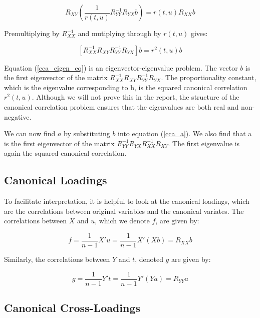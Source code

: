 \begin{equation}
 R_{XY}\left( \frac{1}{r(t,u)}R^{-1}_{YY}R_{YX}b \right) = r(t,u)R_{XX}b
\end{equation}

Premultiplying by $R^{-1}_{XX}$ and mutiplying through by $r(t,u)$ gives:

\begin{equation}
  \label{cca_eigen_eq}
 [R^{-1}_{XX}R_{XY}R^{-1}_{YY}R_{YX}]b = r^2(t,u)b
\end{equation}

Equation (\ref{cca_eigen_eq}) is an eigenvector-eigenvalue problem. The vector $b$ is the first eigenvector of the matrix $R^{-1}_{XX}R_{XY}R^{-1}_{YY}R_{YX}$. The proportionality constant, which is the eigenvalue corresponding to b, is the squared canonical correlation $r^2(t,u)$. Although we will not prove this in the report, the structure of the canonical correlation problem ensures that the eigenvalues are both real and non-negative\cite{carroll1997mathematical}. 

We can now find $a$ by substituting $b$ into equation (\ref{cca_a}). We also find that a is the first eigenvector of the matrix $R^{-1}_{YY}R_{YX}R^{-1}_{XX}R_{XY}$. The first eigenvalue is again the squared canonical correlation.

\subsection{Canonical Loadings}

To facilitate interpretation, it is helpful to look at the canonical loadings, which are the correlations between original variables and the canonical variates. The correlations between $X$ and $u$, which we denote $f$, are given by:

\begin{equation}
 f = \frac{1}{n-1}X'u = \frac{1}{n-1}X'(Xb) = R_{XX}b
\end{equation}

Similarly, the correlations between $Y$ and $t$, denoted $g$ are given by:

\begin{equation}
 g = \frac{1}{n-1}Y't = \frac{1}{n-1}Y'(Ya) = R_{YY}a
\end{equation}

\subsection{Canonical Cross-Loadings}
